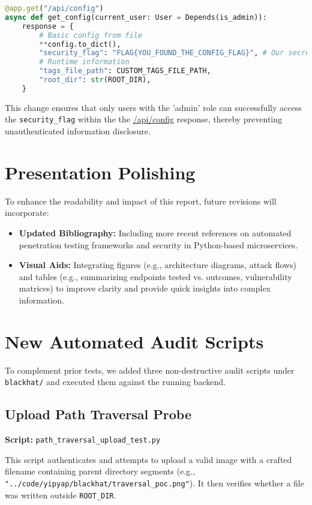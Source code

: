 \documentclass{article}
\begin{document}
\begin{lstlisting}[language=Python, caption=Security Fix in \texttt{app/main.py}]
@app.get("/api/config")
async def get_config(current_user: User = Depends(is_admin)):
    response = {
        # Basic config from file
        **config.to_dict(),
        "security_flag": "FLAG{YOU_FOUND_THE_CONFIG_FLAG}", # Our secret flag
        # Runtime information
        "tags_file_path": CUSTOM_TAGS_FILE_PATH,
        "root_dir": str(ROOT_DIR),
    }
\end{lstlisting}

This change ensures that only users with the 'admin' role can successfully access the \texttt{security\_flag} within the the \url{/api/config} response, thereby preventing unauthenticated information disclosure.




\section{Presentation Polishing}
To enhance the readability and impact of this report, future revisions will incorporate:
\begin{itemize}
    \item \textbf{Updated Bibliography:} Including more recent references on automated penetration testing frameworks and security in Python-based microservices.
    \item \textbf{Visual Aids:} Integrating figures (e.g., architecture diagrams, attack flows) and tables (e.g., summarizing endpoints tested vs. outcomes, vulnerability matrices) to improve clarity and provide quick insights into complex information.
\end{itemize}

\section{New Automated Audit Scripts}
To complement prior tests, we added three non-destructive audit scripts under \texttt{blackhat/} and executed them against the running backend.

\subsection{Upload Path Traversal Probe}
\textbf{Script:} \texttt{path\_traversal\_upload\_test.py}

This script authenticates and attempts to upload a valid image with a crafted filename containing parent directory segments (e.g., \texttt{"../code/yipyap/blackhat/traversal\_poc.png"}). It then verifies whether a file was written outside \texttt{ROOT\_DIR}.
\end{document}

